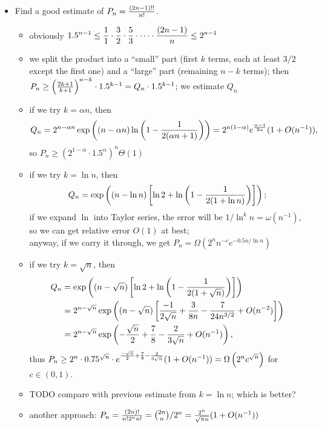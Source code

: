 \documentclass[10pt, a4paper]{article}
\begin{document}
\begin{itemize}
\item Find a good estimate of $P_n = {(2n-1)!!\over n!}$.
\begin{itemize}
    \item obviously $\displaystyle 1.5^{n-1}\le {1\over 1}\cdot {3\over 2}\cdot {5\over 3}\cdot \dots \cdot {(2n-1)\over n}\le 2^{n-1}$
    \item we split the product into a ``small'' part (first $k$ terms, each at least $3/2$ except the first one) and a ``large'' part (remaining $n-k$ terms); then\\
        $P_n\ge \left({2k+1\over k+1}\right)^{n-k}\cdot 1.5^{k-1} = Q_n\cdot 1.5^{k-1}$; we estimate $Q_n$
    \item if we try $k = \alpha n$, then
        $$Q_n = 2^{n-\alpha n} \exp \left((n-\alpha n)\ln \left(1-{1\over 2(\alpha n + 1)}\right)\right)=2^{n(1-\alpha)}e^{{\alpha-1\over 2\alpha}}(1+O(n^{-1})),$$
        so $P_n \ge (2^{1-\alpha}\cdot 1.5^\alpha)^n \Theta(1)$
    \item if we try $k = \ln n$, then
        $$Q_n = \exp\left((n-\ln n)\left[\ln 2 + \ln \left(1-{1\over 2(1+\ln n)}\right)\right]\right);$$
        if we expand $\ln$ into Taylor series, the error will be $1/\ln^k n = \omega(n^{-1})$, so we can get relative error $O(1)$ at best;\\
        anyway, if we carry it through, we get $P_n = \Omega(2^n n^{-c} e^{-0.5n/\ln n})$
    \item if we try $k = \sqrt n$, then
        \begin{align*}
        Q_n &= \exp\left((n-\sqrt n)\left[\ln 2 + \ln \left(1-{1\over 2(1+\sqrt n)}\right)\right]\right)\\
            &= 2^{n-\sqrt n}\exp\left((n-\sqrt n)\left[{-1\over 2\sqrt n} + {3\over 8n}-{7\over 24n^{3/2}}+O(n^{-2})\right]\right)\\
            &= 2^{n-\sqrt n}\exp\left(-{\sqrt n\over 2} + {7\over 8}-{2\over 3\sqrt n}+O(n^{-1})\right),
        \end{align*}
        thus $P_n \ge 2^n \cdot 0.75^{\sqrt n}\cdot e^{{-\sqrt n\over 2}+{7\over 8}-{2\over 3\sqrt n}} (1+O(n^{-1})) = \Omega\left(2^n c^{\sqrt n}\right)$ for $c\in (0, 1)$.
    \item TODO compare with previous estimate from $k=\ln n$; which is better?
    \item another approach: $P_n = {(2n)!\over n! 2^n n!} = {2n\choose n}/2^n = {2^n\over \sqrt{\pi n}}(1+O(n^{-1}))$
\end{itemize}


\end{itemize}
\end{document}
